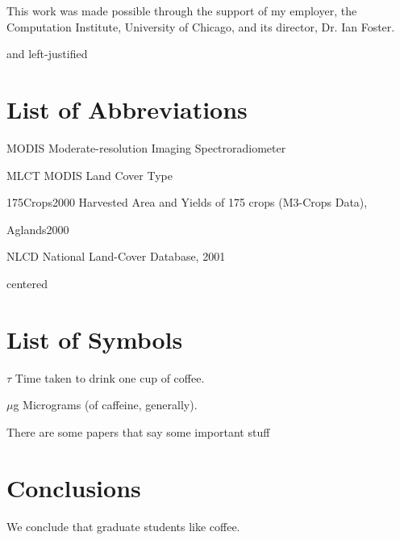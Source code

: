 \documentclass[draftthesis]{style/neiuthesis} \usepackage{natbib}
\begin{document}
This work was made possible through the support of my employer, the
Computation Institute, University of Chicago, and its director,
Dr. Ian Foster.


\tableofcontents \listoftables \listoffigures

and left-justified
\chapter{List of Abbreviations}

\begin{symbollist*}
\item[MODIS] Moderate-resolution Imaging Spectroradiometer
\item[MLCT] MODIS Land Cover Type \citep{MLCT}
\item[175Crops2000] Harvested Area and Yields of 175 crops (M3-Crops
Data), \citep{Monfreda2008}
\item[Aglands2000] \citep{Ramankutty2008}
\item [NLCD] National Land-Cover Database, 2001 \citep{Homer2004}
\end{symbollist*}

centered
\chapter{List of Symbols}

\begin{symbollist}[0.7in]
\item[$\tau$] Time taken to drink one cup of coffee.
\item[$\mu$g] Micrograms (of caffeine, generally).
\end{symbollist}

\mainmatter

There are some papers that say some important stuff
\citep{Ramankutty2008}




\chapter{Conclusions}

We conclude that graduate students like coffee.

\appendix*

%

\backmatter


\end{document}
